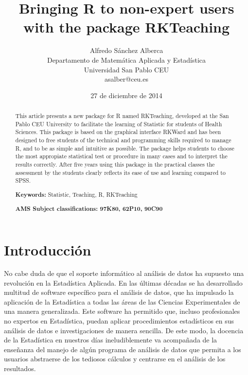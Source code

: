 \documentclass[10pt,twoside,spanish]{article}
\numberwithin{equation}{section}
\begin{document}
\title{%
\vspace*{-2cm}
\textbf{Bringing R to non-expert users with the package RKTeaching} 
%
\vspace*{-0.2cm}%
}
\author{Alfredo Sánchez Alberca\\
Departamento de Matemática Aplicada y Estadística \\
Universidad San Pablo CEU\\
asalber@ceu.es}
\date{27 de diciembre de 2014%
\vspace*{-0.8cm}%
} \maketitle

\begin{abstract}
This article presents  a new package for R named RKTeaching, developed at the San Pablo CEU University to facilitate the learning of
Statistic for students of Health Sciences. This package is based on the graphical interface RKWard and has been designed to free students of
the technical and programming skills required to manage R, and to be as simple and intuitive as possible. The package helps students to
choose the most appropiate statistical test or procedure in many cases and to interpret the results correctly. After five years using this
package in the practical classes the assessment by the students clearly reflects its ease of use and learning compared to SPSS.
\medskip

\noindent\textbf{Keywords:} Statistic, Teaching, R, RKTeaching

\noindent\textbf{AMS Subject classifications: 97K80, 62P10, 90C90}

\end{abstract}


\section{Introducción}
No cabe duda de que el soporte informático al análisis de datos ha supuesto una revolución en la Estadística Aplicada.
En las últimas décadas se ha desarrollado multitud de software específico para el análisis de datos, que ha impulsado la aplicación de la
Estadística a todas las áreas de las Ciencias Experimentales de una manera generalizada.
Este software ha permitido que, incluso profesionales no expertos en Estadística, puedan aplicar procedimientos estadísticos en sus análisis
de datos e investigaciones de manera sencilla.
De este modo, la docencia de la Estadística en nuestros días ineludiblemente va acompañada de la enseñanza del manejo de algún programa de
análisis de datos que permita a los usuarios abstraerse de los tediosos cálculos y centrarse en el análisis de los resultados.
\end{document}
